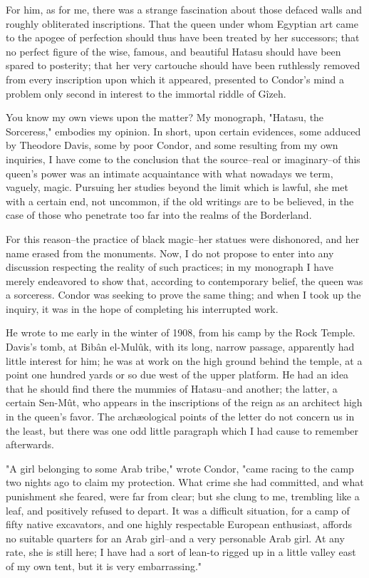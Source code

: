 For him, as for me, there was a strange fascination about those
defaced walls and roughly obliterated inscriptions. That the queen
under whom Egyptian art came to the apogee of perfection should thus
have been treated by her successors; that no perfect figure of the
wise, famous, and beautiful Hatasu should have been spared to
posterity; that her very cartouche should have been ruthlessly removed
from every inscription upon which it appeared, presented to Condor's
mind a problem only second in interest to the immortal riddle of
Gîzeh.

You know my own views upon the matter? My monograph, "Hatasu, the
Sorceress," embodies my opinion. In short, upon certain evidences,
some adduced by Theodore Davis, some by poor Condor, and some
resulting from my own inquiries, I have come to the conclusion that
the source--real or imaginary--of this queen's power was an intimate
acquaintance with what nowadays we term, vaguely, magic. Pursuing her
studies beyond the limit which is lawful, she met with a certain end,
not uncommon, if the old writings are to be believed, in the case of
those who penetrate too far into the realms of the Borderland.

For this reason--the practice of black magic--her statues were
dishonored, and her name erased from the monuments. Now, I do not
propose to enter into any discussion respecting the reality of such
practices; in my monograph I have merely endeavored to show that,
according to contemporary belief, the queen was a sorceress. Condor
was seeking to prove the same thing; and when I took up the inquiry,
it was in the hope of completing his interrupted work.

He wrote to me early in the winter of 1908, from his camp by the Rock
Temple. Davis's tomb, at Bibân el-Mulûk, with its long, narrow
passage, apparently had little interest for him; he was at work on the
high ground behind the temple, at a point one hundred yards or so due
west of the upper platform. He had an idea that he should find there
the mummies of Hatasu--and another; the latter, a certain Sen-Mût, who
appears in the inscriptions of the reign as an architect high in the
queen's favor. The archæological points of the letter do not concern
us in the least, but there was one odd little paragraph which I had
cause to remember afterwards.

"A girl belonging to some Arab tribe," wrote Condor, "came racing to
the camp two nights ago to claim my protection. What crime she had
committed, and what punishment she feared, were far from clear; but
she clung to me, trembling like a leaf, and positively refused to
depart. It was a difficult situation, for a camp of fifty native
excavators, and one highly respectable European enthusiast, affords no
suitable quarters for an Arab girl--and a very personable Arab girl.
At any rate, she is still here; I have had a sort of lean-to rigged up
in a little valley east of my own tent, but it is very embarrassing."

